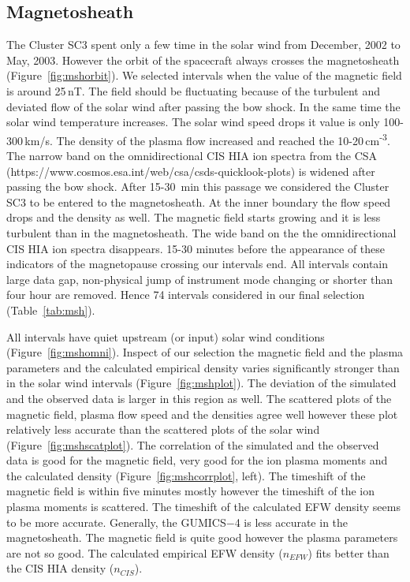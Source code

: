 \documentclass[linenumbers,draft]{agujournal}
\begin{document}
\subsection{Magnetosheath}
\label{sec:msh}

The Cluster SC3 spent only a few time in the solar wind from December, 2002 to May, 2003. However the orbit of the spacecraft always crosses the magnetosheath (Figure~\ref{fig:mshorbit}). We selected intervals when the value of the magnetic field is around 25\,nT. The field should be fluctuating because of the turbulent and deviated flow of the solar wind after passing the bow shock. In the same time the solar wind temperature increases. The solar wind speed drops it value is only 100-300\,km/s. The density of the plasma flow increased and reached the 10-20\,cm\textsuperscript{-3}.  The narrow band on the  omnidirectional CIS HIA ion spectra from the CSA (https://www.cosmos.esa.int/web/csa/csds-quicklook-plots) is widened after passing the bow shock. After 15-30 \,min this passage we considered the Cluster SC3 to be entered to the magnetosheath. At the inner boundary the flow speed drops and the density as well. The magnetic field starts growing and it is less turbulent than in the magnetosheath. The wide band on the  the omnidirectional CIS HIA ion spectra disappears. 15-30 minutes before the appearance  of these indicators of the magnetopause crossing our intervals end. All intervals contain large data gap, non-physical jump of instrument mode changing or shorter than four hour are removed. Hence 74 intervals considered in our final selection (Table~\ref{tab:msh}). 

All intervals have quiet upstream (or input) solar wind conditions (Figure~\ref{fig:mshomni}). Inspect of our selection the magnetic field and the plasma parameters and the calculated empirical density varies significantly stronger than in the solar wind intervals (Figure~\ref{fig:mshplot}). The deviation of the simulated and the observed data is larger in this region as well. The scattered plots of the magnetic field, plasma flow speed and the densities agree well however these plot relatively less accurate than the scattered plots of the solar wind (Figure~\ref{fig:mshscatplot}). The correlation of the simulated and the observed data is good for the magnetic field, very good for the ion plasma moments and the calculated density (Figure~\ref{fig:mshcorrplot}, left). The timeshift of the magnetic field is within five minutes mostly however the timeshift of the ion plasma moments is scattered. The timeshift of the calculated EFW density seems to be more accurate. Generally, the GUMICS$-$4 is less accurate in the magnetosheath. The magnetic field is quite good however the plasma parameters are not so good. The calculated empirical EFW density ($n_{EFW}$) fits better than the CIS HIA density ($n_{CIS}$).
\end{document}
